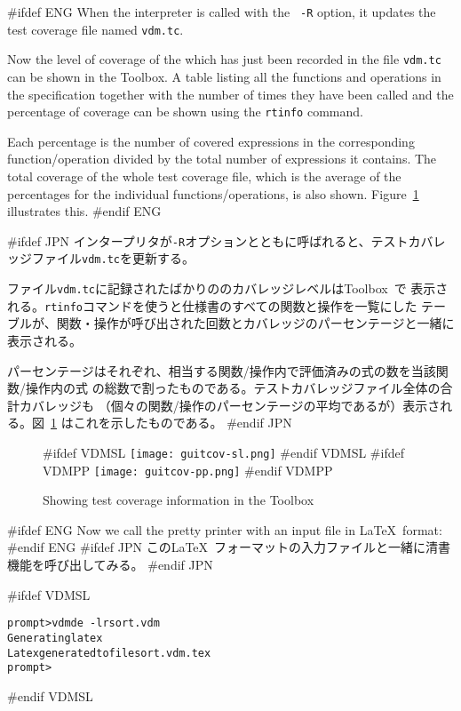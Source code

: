 \documentclass[\pformat,12pt]{article}
\newcommand{\Toolbox}{Toolbox}
\newcommand{\vdmde}{vdmde}
\newcommand{\Toolbox}{Toolbox}
\newcommand{\vdmde}{vppde}
\newcommand{\cmd}{\tt }
\begin{document}
#ifdef ENG
When the interpreter is called with the {\tt 
-R} option, it updates the test coverage file named {\tt vdm.tc}.

Now the level of coverage of the  which has just been recorded in
  the file {\tt vdm.tc} can be shown in the \Toolbox.  A
table listing all the functions and operations in the specification
together with the number of times they have been called and the
percentage of coverage can be shown using the {\cmd rtinfo} command.

Each percentage is the number of covered expressions in the
  corresponding function/operation 
divided by the total number of expressions it contains.  The total
coverage of the whole test coverage file, which is the average of the
percentages for the individual functions/operations, is also
shown. Figure~\ref{fig:rtinfo} illustrates this.
#endif ENG

#ifdef JPN
インタープリタが{\tt -R}オプションとともに呼ばれると、テストカバレッジファイル{\tt vdm.tc}を更新する。

ファイル{\tt vdm.tc}に記録されたばかりののカバレッジレベルは\Toolbox\ で
表示される。{\cmd rtinfo}コマンドを使うと仕様書のすべての関数と操作を一覧にした
テーブルが、関数・操作が呼び出された回数とカバレッジのパーセンテージと一緒に
表示される。

パーセンテージはそれぞれ、相当する関数/操作内で評価済みの式の数を当該関数/操作内の式
の総数で割ったものである。テストカバレッジファイル全体の合計カバレッジも
（個々の関数/操作のパーセンテージの平均であるが）表示される。図~\ref{fig:rtinfo} 
はこれを示したものである。
#endif JPN

\begin{figure}[tbh]
\begin{center}
#ifdef VDMSL
\texttt{[image: guitcov-sl.png]}
#endif VDMSL
#ifdef VDMPP
\texttt{[image: guitcov-pp.png]}
#endif VDMPP
\caption{Showing test coverage information in the \protect\Toolbox}
\label{fig:rtinfo}
\end{center}
\end{figure}

#ifdef ENG
Now we call the pretty printer with an input file in \LaTeX\ format:
#endif ENG
#ifdef JPN
この\LaTeX\ フォーマットの入力ファイルと一緒に清書機能を呼び出してみる。
#endif JPN

#ifdef VDMSL
\begin{alltt}
prompt> \vdmde\ -lr sort.vdm 
Generating latex
Latex generated to file sort.vdm.tex
prompt>
\end{alltt}
#endif VDMSL
\end{document}
